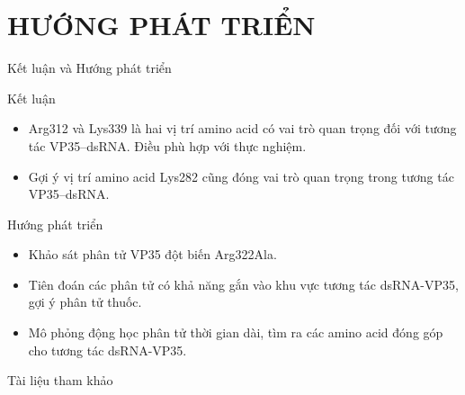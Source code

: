 \documentclass[10pt]{beamer}
\begin{document}
\section{HƯỚNG PHÁT TRIỂN}
	\begin{frame}{Kết luận và Hướng phát triển}
		\begin{block}{Kết luận}
		\begin{itemize}
		\item Arg312 và Lys339 là hai vị trí amino acid có vai trò quan trọng đối với tương tác VP35--dsRNA. Điều phù hợp với thực nghiệm\cite{Leung2010}.
		\item Gợi ý vị trí amino acid Lys282 cũng đóng vai trò quan trọng trong tương tác VP35--dsRNA.
		\end{itemize}
		\end{block}
		\begin{block}{Hướng phát triển}
		\begin{itemize}
		\item Khảo sát phân tử VP35 đột biến Arg322Ala.
		\item Tiên đoán các phân tử có khả năng gắn vào khu vực tương tác dsRNA-VP35, gợi ý phân tử thuốc.
		\item Mô phỏng động học phân tử thời gian dài, tìm ra các amino acid đóng góp cho tương tác dsRNA-VP35.
		\end{itemize}
		\end{block}
	\end{frame}

\begin{frame}[allowframebreaks]{Tài liệu tham khảo}

\printbibliography

\end{frame}



\appendix
\end{document}

